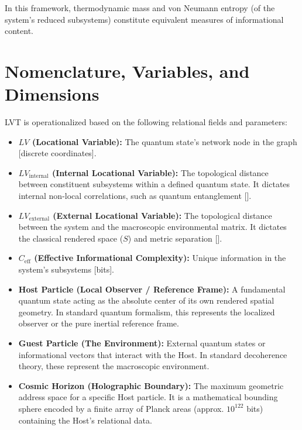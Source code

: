 \documentclass[12pt,a4paper]{article}
\begin{document}
In this framework, thermodynamic mass and von Neumann entropy (of the system's reduced subsystems) constitute equivalent measures of informational content.

\section{Nomenclature, Variables, and Dimensions}

LVT is operationalized based on the following relational fields and parameters:

\begin{itemize}
    \item \textbf{$LV$ (Locational Variable):} The quantum state's network node in the graph [discrete coordinates].
    \item \textbf{$LV_{\mathrm{internal}}$ (Internal Locational Variable):} The topological distance between constituent subsystems within a defined quantum state. It dictates internal non-local correlations, such as quantum entanglement [].
    \item \textbf{$LV_{\mathrm{external}}$ (External Locational Variable):} The topological distance between the system and the macroscopic environmental matrix. It dictates the classical rendered space ($S$) and metric separation [].
    \item \textbf{$C_{\mathrm{eff}}$ (Effective Informational Complexity):} Unique information in the system's subsystems [bits].

    \item \textbf{Host Particle (Local Observer / Reference Frame):} A fundamental quantum state acting as the absolute center of its own rendered spatial geometry. In standard quantum formalism, this represents the localized observer or the pure inertial reference frame.
\item \textbf{Guest Particle (The Environment):} External quantum states or informational vectors that interact with the Host. In standard decoherence theory, these represent the macroscopic environment.
\item \textbf{Cosmic Horizon (Holographic Boundary):} The maximum geometric address space for a specific Host particle. It is a mathematical bounding sphere encoded by a finite array of Planck areas (approx. $10^{122}$ bits) containing the Host's relational data.


\end{itemize}
\end{document}
